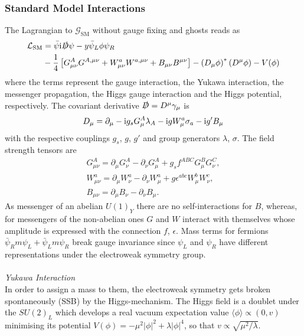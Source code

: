 \subsubsection{Standard Model Interactions}
The Lagrangian to $\mathcal{G}_\text{SM}$ without gauge fixing and ghosts reads as
\begin{align}
 \mathcal{L}_\text{SM} &= \bar \psi \text{i} \slashed{D}\psi -y\bar\psi_L\phi\psi_R \nonumber\\
 &- \frac14\left[G^A_{\mu\nu}G^{A,\mu\nu} + W^a_{\mu\nu}W^{a,\mu\nu} + B_{\mu\nu}B^{\mu\nu}\right] - \left(D_\mu\phi\right)^*\left(D^\mu\phi\right) - V(\phi)    
 \label{eq_smlagrange}
\end{align}
where the terms represent the gauge interaction, the Yukawa interaction, the messenger propagation, the Higgs gauge interaction and
the Higgs potential, respectively. The covariant derivative $\slashed{D}=D^\mu\gamma_\mu$ is
\begin{align}
 D_\mu = \partial_\mu -\text{i} g_s G^A_\mu \lambda_A - \text{i} g W^a_\mu\sigma_a - \text{i} g'B_\mu
\end{align}
with the respective couplings $g_s$, $g$, $g'$ and group generators $\lambda$, $\sigma$. The field strength tensors are
\begin{align}
 G^A_{\mu\nu} = \partial_\mu G^A_\nu - \partial_\nu G^A_\mu + g_s f^{ABC}G^B_\mu G^C_\nu,\\
 W^a_{\mu\nu} = \partial_\mu W^a_\nu - \partial_\nu W^a_\mu + g \epsilon^{abc}W^b_\mu W^c_\nu,\\
 B_{\mu\nu} = \partial_\mu B_\nu - \partial_\nu B_\mu.
\end{align}
As messenger of an abelian $U(1)_Y$ there are no self-interactions for $B$, whereas, for messengers of the non-abelian ones $G$ and $W$ interact 
with themselves whose amplitude is expressed with the connection $f$, $\epsilon$. Mass terms for fermions $\bar\psi_R m\psi_L + \bar\psi_L m\psi_R$ 
break gauge invariance since $\psi_L$ and $\psi_R$ have different representations under the electroweak symmetry group. 
\\ \\ \textit{Yukawa Interaction} \\
\noindent In order to assign a 
mass to them, the electroweak symmetry gets broken spontaneously (SSB) by the Higgs-mechanism. The Higgs field is a doublet under the $SU(2)_L$ which 
develops 
a real vacuum expectation value $\langle \phi\rangle \propto (0,v)$ minimising its potential $V(\phi)=-\mu^2|\phi|^2+\lambda|\phi|^4$, so that
$v\propto\sqrt{\mu^2/\lambda}$. 
